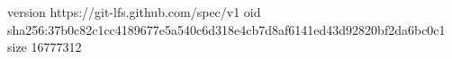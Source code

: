 version https://git-lfs.github.com/spec/v1
oid sha256:37b0c82c1cc4189677e5a540c6d318e4cb7d8af6141ed43d92820bf2da6bc0c1
size 16777312
